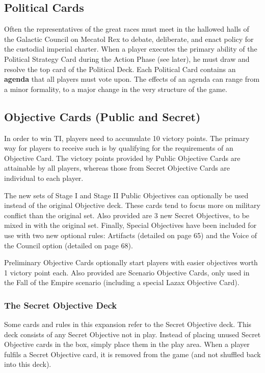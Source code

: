 \documentclass[11pt,fleqn]{book} %
\begin{document}
\subsection{Political Cards}
Often the representatives of the great races must meet in the hallowed halls of the Galactic Council on
Mecatol Rex to debate, deliberate, and enact policy for the custodial imperial charter. When a player executes the primary ability of the Political Strategy Card during the Action Phase (see later), he must draw and resolve the top card of the Political Deck. Each Political Card contains an \textbf{agenda} that all players must vote upon. The effects of an agenda can range from a minor formality, to a major change in the very structure of the game.

\subsection{Objective Cards (Public and Secret)}
In order to win TI, players need to accumulate 10 victory points. The primary way for players to receive such is by qualifying for the requirements of an Objective Card. The victory points provided by Public Objective Cards are attainable by all players, whereas those from Secret Objective Cards are individual to each player.
\begin{SEbox}
    
The new sets of Stage I and Stage II Public Objectives can optionally be used instead of the original Objective deck. These cards tend to focus more on military conflict than the original set. Also provided are 3 new Secret Objectives, to be mixed in with the original set.
Finally, Special Objectives have been included for use with two new optional rules: Artifacts (detailed on page 65) and the Voice of the Council option (detailed on page 68).
\end{SEbox}
\begin{STbox}
Preliminary Objective Cards optionally start players with easier objectives worth 1 victory point each. Also provided are Scenario Objective Cards, only used in the Fall of the Empire scenario (including a special Lazax Objective Card).
\end{STbox}
\begin{STbox}
    
\subsubsection{The Secret Objective Deck}
Some cards and rules in this expansion refer to the Secret Objective deck. This deck consists of any Secret Objective not in play. Instead of placing unused Secret Objective cards in the box, simply place them in the play area. When a player fulfils a Secret Objective card, it is removed from the game (and not shuffled back into this deck).
\end{STbox}
\end{document}
